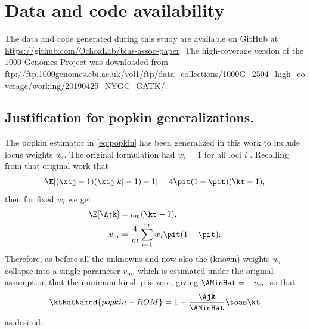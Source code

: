 \documentclass[11pt]{article}
\begin{document}
\section*{Data and code availability}
The data and code generated during this study are available on GitHub at \url{https://github.com/OchoaLab/bias-assoc-paper}.
The high-coverage version of the 1000 Genomes Project was downloaded from \url{ftp://ftp.1000genomes.ebi.ac.uk/vol1/ftp/data_collections/1000G_2504_high_coverage/working/20190425_NYGC_GATK/}.


\printbibliography


\begin{appendices}
  \appendix

  \appendixpage
  
  \section{Justification for popkin generalizations.}

  \label{sec:popkin_w_justif}

  The popkin estimator in \cref{eq:popkin} has been generalized in this work to include locus weights $w_i$.
  The original formulation had $w_i=1$ for all loci $i$ \citep{ochoa_estimating_2021}.
  Recalling from that original work that
  $$
  \E[ (\xij-1)(\xij[k]-1) - 1 ] = 4 \pit ( 1 - \pit ) ( \kt - 1 ),
  $$
  then for fixed $w_i$ we get
  \begin{align*}
    \E[ \Ajk ]
    &=
      v_m ( \kt - 1 )
      , \\
    v_m
    &=
      \frac{4}{m} \sum_{i=1}^m w_i \pit ( 1 - \pit )
      .
  \end{align*}
  Therefore, as before all the unknowns \pit and now also the (known) weights $w_i$ collapse into a single parameter $v_m$, which is estimated under the original assumption that the minimum kinship is zero, giving $\AMinHat = -v_m$, so that
  $$
  \ktHatNamed{popkin-ROM}
  =
  1 - \frac{\Ajk}{\AMinHat}
  \toas
  \kt
  $$
  as desired.


\end{appendices}
\end{document}
